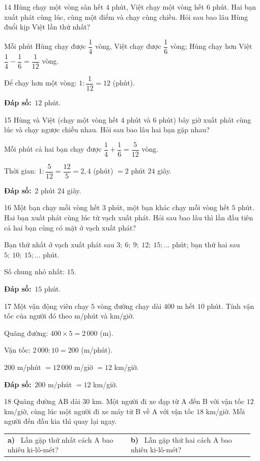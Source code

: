 \documentclass[11pt]{article}
\makeatletter
\newif\ifsol \solfalse
\renewcommand{\arraystretch}{1.35}
\providecommand{\AnsWord}{Đáp số}
\newcommand{\dapso}[1]{\par\textbf{\AnsWord:}\ #1}
\newcommand{\probsol}[1]{%
  \begin{lrbox}{\solmeasure}\begin{minipage}{\dimexpr\linewidth-24pt\relax}#1\end{minipage}\end{lrbox}%
  \ifsol
    \begin{solbox}#1\end{solbox}%
  \else
    \setlength{\solht}{\dimexpr\ht\solmeasure+\dp\solmeasure+0.85cm\relax}%
    \ifdim\solht<1.35cm\setlength{\solht}{1.35cm}\fi
    \begin{tcolorbox}[colback=white,colframe=Line,boxrule=0.8pt,arc=5pt,
      left=8pt,right=8pt,top=4pt,bottom=4pt,height=\solht]{\footnotesize\color{Slate}\itshape\WorkWord}\end{tcolorbox}%
  \fi}
\newcommand{\pa}[1]{\textbf{#1)}\ }
\newenvironment{cols2}{\par\vspace{3pt}\noindent\setlength{\tabcolsep}{0pt}\renewcommand{\arraystretch}{1.3}%
  \begin{tabular}{@{}>{\raggedright\arraybackslash\rule{0pt}{4.4ex}}p{0.48\linewidth}<{\rule[-2.3ex]{0pt}{0pt}}@{\hspace{0.03\linewidth}}>{\raggedright\arraybackslash\rule{0pt}{4.4ex}}p{0.48\linewidth}<{\rule[-2.3ex]{0pt}{0pt}}@{}}}%
  {\end{tabular}\par}
\newcommand{\gap}{\vspace{0.3cm}}
\def\WorkWord{Bài làm:}
\def\AnsWord{Đáp số}
\makeatother
\begin{document}
\gap
\begin{probbox}{14}{\relax}
Hùng chạy một vòng sân hết $4$ phút, Việt chạy một vòng hết $6$ phút. Hai bạn xuất phát cùng lúc, cùng một điểm và chạy cùng chiều. Hỏi sau bao lâu Hùng đuổi kịp Việt lần thứ nhất?
\end{probbox}
\probsol{
Mỗi phút Hùng chạy được $\dfrac14$ vòng, Việt chạy được $\dfrac16$ vòng; Hùng chạy hơn Việt $\dfrac14-\dfrac16=\dfrac1{12}$ vòng.\par
Để chạy hơn một vòng: $1:\dfrac1{12}=12$ (phút).
\dapso{$12$ phút.}}
\gap
\begin{probbox}{15}{\relax}
Hùng và Việt (chạy một vòng hết $4$ phút và $6$ phút) bây giờ xuất phát cùng lúc và chạy ngược chiều nhau. Hỏi sau bao lâu hai bạn gặp nhau?
\end{probbox}
\probsol{
Mỗi phút cả hai bạn chạy được $\dfrac14+\dfrac16=\dfrac5{12}$ vòng.\par
Thời gian: $1:\dfrac5{12}=\dfrac{12}5=2{,}4$ (phút) $=2$ phút $24$ giây.
\dapso{$2$ phút $24$ giây.}}
\gap
\begin{probbox}{16}{\relax}
Một bạn chạy mỗi vòng hết $3$ phút, một bạn khác chạy mỗi vòng hết $5$ phút. Hai bạn xuất phát cùng lúc từ vạch xuất phát. Hỏi sau bao lâu thì lần đầu tiên cả hai bạn cùng có mặt ở vạch xuất phát?
\end{probbox}
\probsol{
Bạn thứ nhất ở vạch xuất phát sau $3;\ 6;\ 9;\ 12;\ 15;\ldots$ phút; bạn thứ hai sau $5;\ 10;\ 15;\ldots$ phút.\par
Số chung nhỏ nhất: $15$.
\dapso{$15$ phút.}}
\gap
\begin{probbox}{17}{\relax}
Một vận động viên chạy $5$ vòng đường chạy dài $400$ m hết $10$ phút. Tính vận tốc của người đó theo m/phút và km/giờ.
\end{probbox}
\probsol{
Quãng đường: $400\times5=2\,000$ (m).\par Vận tốc: $2\,000:10=200$ (m/phút).\par $200$ m/phút $=12\,000$ m/giờ $=12$ km/giờ.
\dapso{$200$ m/phút $=12$ km/giờ.}}
\gap
\begin{probbox}{18}{\relax}
Quãng đường AB dài $30$ km. Một người đi xe đạp từ A đến B với vận tốc $12$ km/giờ, cùng lúc một người đi xe máy từ B về A với vận tốc $18$ km/giờ. Mỗi người đến đầu kia thì quay lại ngay.
\begin{cols2}
\pa{a} Lần gặp thứ nhất cách A bao nhiêu ki-lô-mét? & \pa{b} Lần gặp thứ hai cách A bao nhiêu ki-lô-mét?
\end{cols2}
\end{probbox}
\end{document}
